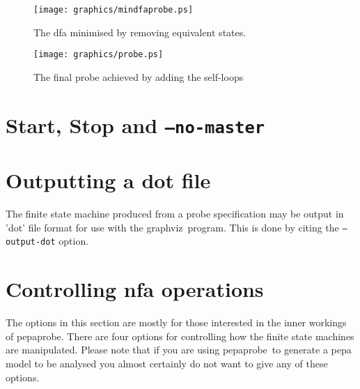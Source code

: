 \documentclass[10pt,a4paper]{article}
\newcommand{\pepaprobe}{\textsf{pepaprobe}}
\newcommand{\graphviz}{\textsf{graphviz}}
\begin{document}
\begin{figure}[htb]
\begin{center}
\texttt{[image: graphics/mindfaprobe.ps]}
\end{center}
\caption{
\label{mindfaprobefigure}
The dfa minimised by removing equivalent states.
}
\end{figure}

\begin{figure}[htb]
\begin{center}
\texttt{[image: graphics/probe.ps]}
\end{center}
\caption{
\label{finalprobefigure}
The final probe achieved by adding the self-loops
}
\end{figure}

\section{Start, Stop and \texttt{--no-master}}

\section{Outputting a dot file}

The finite state machine produced from a probe specification may be
output in 'dot' file format for use with the \graphviz\ program.
This is done by citing the \texttt{--output-dot} option.

\section{Controlling nfa operations}
The options in this section are mostly for those interested in the
inner workings of \pepaprobe.
There are four options for controlling how the finite state machines
are manipulated. Please note that if you are using \pepaprobe\ to
generate a pepa model to be analysed you almost certainly do not want
to give any of these options.
\end{document}
